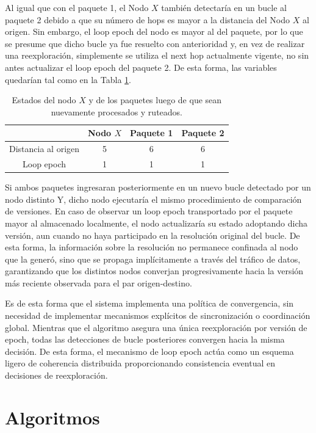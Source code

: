 Al igual que con el paquete 1, el Nodo $X$ también detectaría en un bucle al paquete 2 debido a que su número de hops es mayor a la distancia del Nodo $X$ al origen. Sin embargo, el loop epoch del nodo es mayor al del paquete, por lo que se presume que dicho bucle ya fue resuelto con anterioridad y, en vez de realizar una reexploración, simplemente se utiliza el next hop actualmente vigente, no sin antes actualizar el loop epoch del paquete 2. De esta forma, las variables quedarían tal como en la Tabla \ref{tab:loop-epoch-5}.

\begin{table}[]
    \centering
    \begin{tabular}{|c|c|c|c|}
        \hline
        & Nodo $X$ & Paquete 1 & Paquete 2 \\
        \hline
        Distancia al origen & 5 & 6 & 6 \\
        \hline
        Loop epoch & 1 & 1 & 1 \\
        \hline
    \end{tabular}
    \caption{Estados del nodo $X$ y de los paquetes luego de que sean nuevamente procesados y ruteados.}
    \label{tab:loop-epoch-5}
\end{table}

Si ambos paquetes ingresaran posteriormente en un nuevo bucle detectado por un nodo distinto Y, dicho nodo ejecutaría el mismo procedimiento de comparación de versiones. En caso de observar un loop epoch transportado por el paquete mayor al almacenado localmente, el nodo actualizaría su estado adoptando dicha versión, aun cuando no haya participado en la resolución original del bucle. De esta forma, la información sobre la resolución no permanece confinada al nodo que la generó, sino que se propaga implícitamente a través del tráfico de datos, garantizando que los distintos nodos converjan progresivamente hacia la versión más reciente observada para el par origen-destino.

Es de esta forma que el sistema implementa una política de convergencia, sin necesidad de implementar mecanismos explícitos de sincronización o coordinación global. Mientras que el algoritmo asegura una única reexploración por versión de epoch, todas las detecciones de bucle posteriores convergen hacia la misma decisión. De esta forma, el mecanismo de loop epoch actúa como un esquema ligero de coherencia distribuida proporcionando consistencia eventual en decisiones de reexploración.


\section{Algoritmos}

